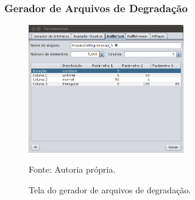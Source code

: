         \begin{frame}\frametitle{Gerador de Arquivos de Degradação}
		    \begin{figure}
			    \includegraphics[width=0.6\textwidth]{./imgs/ferramentas-raffle.png}
			    \caption{Tela do gerador de arquivos de degradação.}
			    \tiny
			    Fonte: Autoria própria.
		    \end{figure}
        \end{frame}

